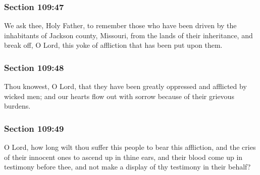 	\subsubsection{Section 109:47} %
		\label{DC109-47}

		We ask thee, Holy Father, to remember those who have been driven by the inhabitants of Jackson county, Missouri, from the lands of their inheritance, and break off, O Lord, this yoke of affliction that has been put upon them.


	\subsubsection{Section 109:48} %
		\label{DC109-48}

		Thou knowest, O Lord, that they have been greatly oppressed and afflicted by wicked men; and our hearts flow out with sorrow because of their grievous burdens.


	\subsubsection{Section 109:49} %
		\label{DC109-49}

		O Lord, how long wilt thou suffer this people to bear this affliction, and the cries of their innocent ones to ascend up in thine ears, and their blood come up in testimony before thee, and not make a display of thy testimony in their behalf?


